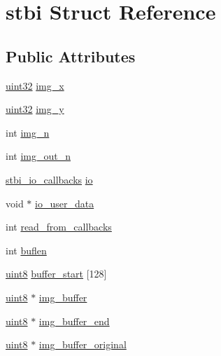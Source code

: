 \hypertarget{structstbi}{}\section{stbi Struct Reference}
\label{structstbi}
\subsection*{Public Attributes}
\begin{DoxyCompactItemize}
\item 
\hyperlink{stb__image_8c_a1134b580f8da4de94ca6b1de4d37975e}{uint32} \hyperlink{structstbi_af3b42c257fb0d8896f29ca3921540a42}{img\+\_\+x}
\item 
\hyperlink{stb__image_8c_a1134b580f8da4de94ca6b1de4d37975e}{uint32} \hyperlink{structstbi_a60cb5a630e268b2d12306c6eca246dd1}{img\+\_\+y}
\item 
int \hyperlink{structstbi_ae22cfcc23f5ab67bede22942333ecbd7}{img\+\_\+n}
\item 
int \hyperlink{structstbi_a33f6519d8f99b84afbde795dc7a931f2}{img\+\_\+out\+\_\+n}
\item 
\hyperlink{structstbi__io__callbacks}{stbi\+\_\+io\+\_\+callbacks} \hyperlink{structstbi_a86596e1eb2b0f57a60a18777bd37ff53}{io}
\item 
void $\ast$ \hyperlink{structstbi_a9838a0c89630f283c25a16f4e30f40aa}{io\+\_\+user\+\_\+data}
\item 
int \hyperlink{structstbi_acb201cc1b3eb134f342cee89f5d11e70}{read\+\_\+from\+\_\+callbacks}
\item 
int \hyperlink{structstbi_a76d6f761529ecff7f02469b19371af0e}{buflen}
\item 
\hyperlink{stb__image_8c_adde6aaee8457bee49c2a92621fe22b79}{uint8} \hyperlink{structstbi_af99edda496281a6ca1b58271cabdbc69}{buffer\+\_\+start} \mbox{[}128\mbox{]}
\item 
\hyperlink{stb__image_8c_adde6aaee8457bee49c2a92621fe22b79}{uint8} $\ast$ \hyperlink{structstbi_aace36d5487a596bea5faa0aef0398ac8}{img\+\_\+buffer}
\item 
\hyperlink{stb__image_8c_adde6aaee8457bee49c2a92621fe22b79}{uint8} $\ast$ \hyperlink{structstbi_a55f78565e605f1784d47fc9acea475f3}{img\+\_\+buffer\+\_\+end}
\item 
\hyperlink{stb__image_8c_adde6aaee8457bee49c2a92621fe22b79}{uint8} $\ast$ \hyperlink{structstbi_a261be6edda817862e623972b21b4f965}{img\+\_\+buffer\+\_\+original}
\end{DoxyCompactItemize}


